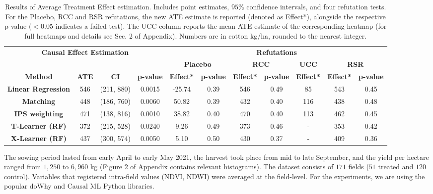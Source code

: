 \documentclass[letterpaper]{article} %
\begin{document}
\begin{table}[!ht]
\small
\centering
\begin{tabular}{cccccccccccc}
\toprule
\multicolumn{4}{c}{\multirow{2}{*}{\textbf{Causal Effect Estimation}}} & \multicolumn{8}{c}{\textbf{Refutations}}                                              \\ \cmidrule(l){5-12}
\multicolumn{4}{c}{} &
  \multicolumn{2}{c}{\textbf{Placebo}} &
  \multicolumn{2}{c}{\textbf{RCC}} &
  \multicolumn{2}{c}{\textbf{UCC}} &
  \multicolumn{2}{c}{\textbf{RSR}} \\ \midrule
\textbf{Method} & \textbf{ATE} & \textbf{CI} &  \textbf{p-value}
& \textbf{Effect*} & \textbf{p-value} & \textbf{Effect*} &
  \textbf{p-value} &   \multicolumn{2}{c}{\textbf{Effect*}} &
  \textbf{Effect*} & \textbf{p-value} \\
  \midrule
\textbf{Linear Regression}   & 546   & (211, 880)   & 0.0015  & -25.74 & 0.39 & 546 & 0.49  & \multicolumn{2}{c}{85} & 543 & 0.45 \\
\textbf{Matching}            & 448   & (186, 760)   & 0.0060   & 50.82 & 0.39 & 432  & 0.40 & \multicolumn{2}{c}{116} & 438 & 0.48 \\
\textbf{IPS weighting} &  471 &  (138, 816) &  0.0010 &  38.82 &  0.40 &  470 &  0.40 &  \multicolumn{2}{c}{113} &  462 &  0.45 \\
\textbf{T-Learner (RF)}      & 372   & (215, 528)   & 0.0240 & 9.26  & 0.49 & 373 & 0.46 & \multicolumn{2}{c}{-} & 353 & 0.42 \\
\textbf{X-Learner (RF)}      & 437   & (300, 574)   & 0.0050 & 5.10   & 0.50 & 430 & 0.37 & \multicolumn{2}{c}{-} & 409    & 0.36 \\ \bottomrule
\end{tabular}
\caption{Results of Average Treatment Effect estimation. Includes point estimates, $95\%$ confidence intervals, and four refutation tests. For the Placebo, RCC and RSR refutations, the new ATE estimate is reported (denoted as Effect*), alongside the respective p-value ($<0.05$ indicates a failed test). The UCC column reports the mean ATE estimate of the corresponding heatmap (for full heatmaps and details see Sec. 2 of Appendix). Numbers are in cotton kg/ha, rounded to the nearest integer.}
\label{tab:results}
\end{table}

The sowing period lasted from early April to early May 2021, the harvest took place from mid to late September, and the yield per hectare ranged from $1,250$ to $6,960$ kg (Figure 2 of Appendix contains relevant histograms).
The dataset consists of $171$ fields ($51$ treated and $120$ control).
Variables that registered intra-field values (NDVI, NDWI) were averaged at the field-level. For the experiments, we are using the popular doWhy \cite{sharma2020dowhy} and Causal ML \cite{chen2020causalml} Python libraries.
\end{document}
